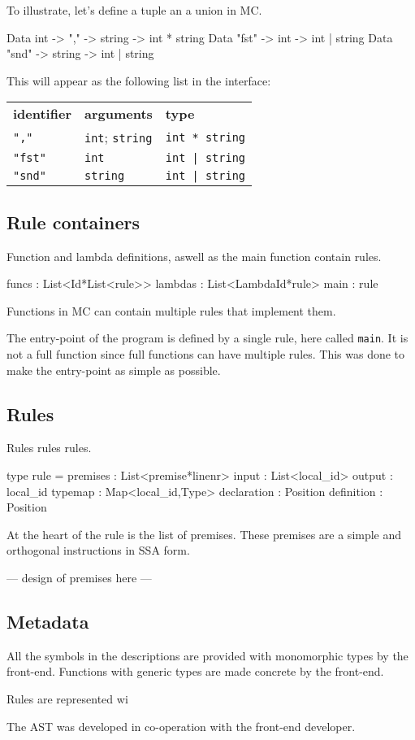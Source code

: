 To illustrate, let's define a tuple an a union in MC.

\begin{code}
Data int -> "," -> string -> int * string
Data "fst" -> int    -> int | string
Data "snd" -> string -> int | string
\end{code}

This will appear as the following list in the interface:

\begin{tabular}{lll}
    \textbf{identifier} & \textbf{arguments} & \textbf{type}\\
    \verb:",":   & \verb:int:; \verb:string: & \verb:int * string: \\
    \verb:"fst": & \verb:int:                & \verb:int | string: \\
    \verb:"snd": & \verb:string:             & \verb:int | string: \\
\end{tabular}


\subsection{Rule containers}

Function and lambda definitions, aswell as the main function contain rules.

\begin{code}
  funcs   : List<Id*List<rule>>
  lambdas : List<LambdaId*rule>
  main    : rule
\end{code}

Functions in MC can contain multiple rules that implement them.

The entry-point of the program is defined by a single rule, here called \verb|main|.
It is not a full function since full functions can have multiple rules.
This was done to make the entry-point as simple as possible.

\subsection{Rules}

Rules rules rules.

\begin{code}
type rule = {
  premises    : List<premise*linenr>
  input       : List<local_id>
  output      : local_id
  typemap     : Map<local_id,Type>
  declaration : Position
  definition  : Position
}
\end{code}

At the heart of the rule is the list of premises.
These premises are a simple and orthogonal instructions in SSA form.

--- design of premises here ---

\subsection{Metadata}

All the symbols in the descriptions are provided with monomorphic types by the front-end.
Functions with generic types are made concrete by the front-end.

Rules are represented wi

The AST was developed in co-operation with the front-end developer.
